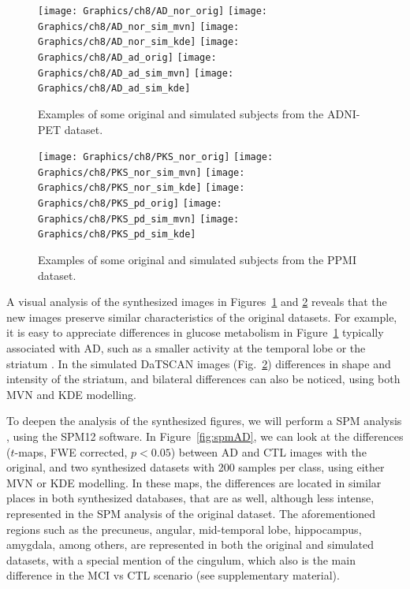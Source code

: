 \begin{figure}[h]
	\centering
	\texttt{[image: Graphics/ch8/AD\_nor\_orig]}
	\texttt{[image: Graphics/ch8/AD\_nor\_sim\_mvn]}
	\texttt{[image: Graphics/ch8/AD\_nor\_sim\_kde]}
	\texttt{[image: Graphics/ch8/AD\_ad\_orig]}
	\texttt{[image: Graphics/ch8/AD\_ad\_sim\_mvn]}
	\texttt{[image: Graphics/ch8/AD\_ad\_sim\_kde]}
	\caption{Examples of some original and simulated subjects from the ADNI-PET dataset.}
	\label{fig:samplesPET}
\end{figure}

\begin{figure}[h]
	\centering
	\texttt{[image: Graphics/ch8/PKS\_nor\_orig]}
	\texttt{[image: Graphics/ch8/PKS\_nor\_sim\_mvn]}
	\texttt{[image: Graphics/ch8/PKS\_nor\_sim\_kde]}
	\texttt{[image: Graphics/ch8/PKS\_pd\_orig]}
	\texttt{[image: Graphics/ch8/PKS\_pd\_sim\_mvn]}
	\texttt{[image: Graphics/ch8/PKS\_pd\_sim\_kde]}
	\caption{Examples of some original and simulated subjects from the PPMI dataset.}
	\label{fig:samplesDAT}
\end{figure}

A visual analysis of the synthesized images in Figures~\ref{fig:samplesPET} and \ref{fig:samplesDAT} reveals that the new images preserve similar characteristics of the original datasets. For example, it is easy to appreciate differences in glucose metabolism in Figure~\ref{fig:samplesPET} typically associated with \ac{AD}, such as a smaller activity at the temporal lobe or the striatum \cite{Stoeckel04,Illan2011}. In the simulated DaTSCAN images (Fig.~\ref{fig:samplesDAT}) differences in shape and intensity of the striatum, and bilateral differences \cite{Towey2011,Illan2012,martinez2014parametrization} can also be noticed, using both \ac{MVN} and \ac{KDE} modelling.

To deepen the analysis of the synthesized figures, we will perform a \ac{SPM} analysis \cite{spm_book}, using the SPM12 software. In Figure~\ref{fig:spmAD}, we can look at the differences ($t$-maps, FWE corrected, $p<0.05$) between \ac{AD} and \ac{CTL} images with the original, and two synthesized datasets with 200 samples per class, using either \ac{MVN} or \ac{KDE} modelling. In these maps, the differences are located in similar places in both synthesized databases, that are as well, although less intense, represented in the \ac{SPM} analysis of the original dataset. The aforementioned regions such as the precuneus, angular, mid-temporal lobe, hippocampus, amygdala, among others, are represented in both the original and simulated datasets, with a special mention of the cingulum, which also is the main difference in the \ac{MCI} vs \ac{CTL} scenario (see supplementary material). 

